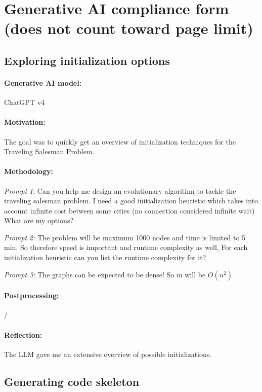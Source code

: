 \documentclass[a4paper,10pt]{article} %
\begin{document}
\section{Generative AI compliance form \hfill(does not count toward page limit)} \label{sec_genai}


\subsection{Exploring initialization options} 
\paragraph{Generative AI model:} ChatGPT v4
\paragraph{Motivation:}
The goal was to quickly get an overview of initialization techniques for the Traveling Salesman Problem.
\paragraph{Methodology:} 
\textit{Prompt 1}: Can you help me design an evolutionary algorithm to tackle the traveling salesman problem. I need a good initialization heuristic which takes into account infinite cost between some cities (no connection considered infinite wait) What are my options?

\noindent
\textit{Prompt 2:} The problem will be maximum 1000 nodes and time is limited to 5 min. So therefore speed is important and runtime complexity as well, For each initialization heuristic can you list the runtime complexity for it?

\noindent
\textit{Prompt 3:} The graphs can be expected to be dense! So m will be $O(n^2)$

\paragraph{Postprocessing:} /

\paragraph{Reflection:} 
The LLM gave me an extensive overview of possible initializations. 



\subsection{Generating code skeleton} 
\end{document}
